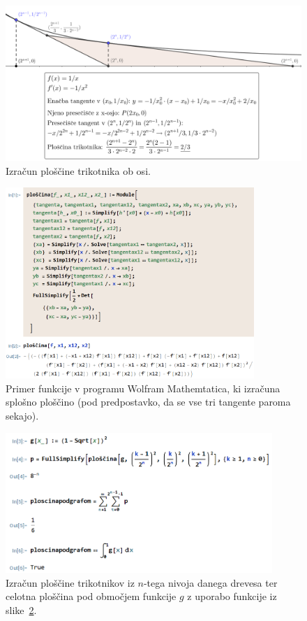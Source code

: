 \documentclass[a4paper, 12pt, titlepage]{article}
\begin{document}
\begin{figure}[H]
    \centering
    \includegraphics[width=\textwidth]{slike/ploscina_trikotnika_2^n.png}
    \caption{Izračun ploščine trikotnika ob osi.}
    \label{ploscina_trikotnika_2^n}
\end{figure}

\begin{figure}[H]
    \centering
    \includegraphics[width=0.84\textwidth]{slike/splosna_ploscina.png}
    \caption{Primer funkcije v programu Wolfram Mathemtatica, ki izračuna splošno ploščino (pod predpostavko, da se vse tri tangente paroma sekajo).}
    \label{splosna_ploscina}
\end{figure}

\begin{figure}[H]
    \centering
    \includegraphics[width=0.9\textwidth]{slike/ilustrativen_primer_wolfram.png}
    \caption{Izračun ploščine trikotnikov iz $ n $-tega nivoja danega drevesa ter celotna ploščina pod območjem funkcije $ g $ z uporabo funkcije iz slike~\ref{splosna_ploscina}.}
    \label{ilustrativen_primer_wolfram}
\end{figure}
\end{document}
